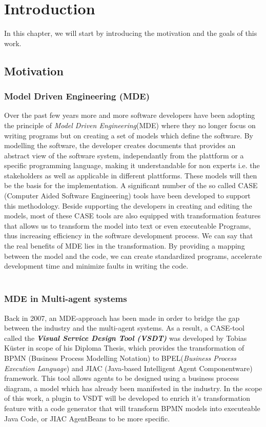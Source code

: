 \chapter{Introduction}
In this chapter, we will start by introducing the motivation and the goals of this work. 
\section{Motivation}
\label{sec:Motivation}
\subsection{Model Driven Engineering (MDE)}
Over the past few years more and more software developers have been adopting the principle of \textit{Model Driven Engineering}(MDE) where 
they no longer focus on writing programs but on creating a set of models which define the software. By modelling the software, the developer creates documents that provides an abstract view of the software system, independantly from the plattform or a specific programming language, making it understandable for non experts i.e. the stakeholders as well as applicable in different plattforms. These models will then be the basis for the implementation. A significant number of the so called  CASE (Computer Aided Software Engineering) tools have been developed to support this methodology. Beside supporting the developers in creating and editing the models, most of these CASE tools are also equipped with transformation features that allows us to transform the model into text or even executeable Programs, thus increasing efficiency in the software development process. We can say that the real benefits of MDE lies in the transformation. By providing a mapping between the model and the code, we can create standardized programs, accelerate development time and minimize faults in writing the code. \\\\

\subsection{MDE in Multi-agent systems}
Back in 2007, an MDE-approach has been made in order to bridge the gap between the industry and the multi-agent systems. As a result, a CASE-tool called the \textbf{\textit{Visual Service Design Tool (VSDT)}} was developed by Tobias K\"uster in scope of his Diploma Thesis, which provides the transformation of BPMN (Business Process Modelling Notation) to BPEL(\textit{Business Process Execution Language}) and JIAC (Java-based Intelligent Agent Componentware) framework. This tool allows agents to be designed using a business process diagram, a model which has already been manifested in the industry. In the scope of this work, a plugin to VSDT will be developed to enrich it's transformation feature with a code generator that will transform BPMN models into executeable Java Code, or JIAC AgentBeans to be more specific. 

